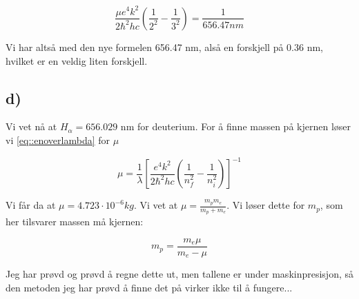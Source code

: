 \documentclass[a4paper,norsk, 10pt]{article}
\begin{document}
$$
\frac{\mu e^4k^2}{2\hbar^2hc}\left(\frac{1}{2^2}-\frac{1}{3^2}\right) = \frac{1}{656.47 nm}
$$

Vi har altså med den nye formelen 656.47 nm, alså en forskjell på 0.36 nm, hvilket er en veldig liten forskjell.

\subsection*{d)}
Vi vet nå at $H_{\alpha} = 656.029$ nm for deuterium. For å finne massen på kjernen løser vi \ref{eq::enoverlambda} for $\mu$

$$
\mu = \frac{1}{\lambda}\left[\frac{ e^4k^2}{2\hbar^2hc}\left(\frac{1}{n_f^2}-\frac{1}{n_i^2}\right)\right]^{-1}
$$

Vi får da at $\mu = 4.723 \cdot 10^{-6} kg$. Vi vet at $\mu = \frac{m_pm_e}{m_p + m_e}$. Vi løser dette for $m_p$, som her tilsvarer massen må kjernen:

$$
m_p = \frac{m_e\mu}{m_e-\mu} 
$$

Jeg har prøvd og prøvd å regne dette ut, men tallene er under maskinpresisjon, så den metoden jeg har prøvd å finne det på virker ikke til å fungere...
\end{document}
